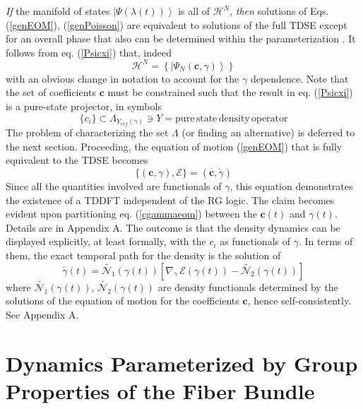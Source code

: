 \documentclass[aps,preprint]{revtex4}%
\begin{document}
\emph{If} the manifold of states $\left|  \Psi(\lambda(t))\right\rangle $ is
all of $\mathcal{H}^{N}$, \emph{then} solutions of Eqs. (\ref{genEOM}),
(\ref{genPoisson}) are equivalent to solutions of the full TDSE except for an
overall phase that also can be determined within the parameterization
\cite{KramSar,BLW94}. It follows from eq. (\ref{Psicxi}) that, indeed
\begin{equation}
\mathcal{H}^{N}=\left\{  \left|  \Psi_{N}(\mathbf{c},\gamma)\right\rangle
\right\}
\end{equation}
with an obvious change in notation to account for the $\gamma$ dependence.
Note that the set of coefficients $\mathbf{c}$ must be constrained such that
the result in eq. (\ref{Psicxi}) is a pure-state projector, in symbols
\begin{equation}
\{c_{i}\}\subset\Lambda_{Y_{ref}(\gamma)}\ni Y=\mathrm{pure \, state\, density
\,operator} \label{posconstraint}%
\end{equation}
The problem of characterizing the set $\Lambda$ (or finding an alternative) is
deferred to the next section. Proceeding, the equation of motion
(\ref{genEOM}) that is fully equivalent to the TDSE becomes
\begin{equation}
\{(\mathbf{c,}\gamma),\mathcal{E}\}=(\dot{\mathbf{c,}}\dot{\gamma})
\label{cgammaeom}%
\end{equation}
Since all the quantities involved are functionals of $\gamma$, this equation
demonstrates the existence of a TDDFT independent of the RG logic. The claim
becomes evident upon partitioning eq. (\ref{cgammaeom}) between the
$\mathbf{c}(t)$ and $\gamma(t)$. Details are in Appendix A. The outcome is
that the density dynamics can be displayed explicitly, at least formally, with
the $c_{i}$ as functionals of $\gamma$. In terms of them, the exact temporal
path for the density is the solution of
\begin{equation}
\dot{\gamma}(t)=\tilde{\mathcal{N}_{1}}(\gamma(t))\left[  \nabla_{\gamma
}\,\mathcal{E}(\gamma(t))-\tilde{\mathcal{N}_{2}}(\gamma(t))\right]
\label{gammadot1}%
\end{equation}
where $\tilde{\mathcal{N}_{1}}(\gamma(t))$, $\tilde{\mathcal{N}_{2}}%
(\gamma(t))$ are density functionals determined by the solutions of the
equation of motion for the coefficients $\mathbf{c}$, hence self-consistently.
See Appendix A.

\section{Dynamics Parameterized by Group Properties of the Fiber Bundle}
\end{document}
